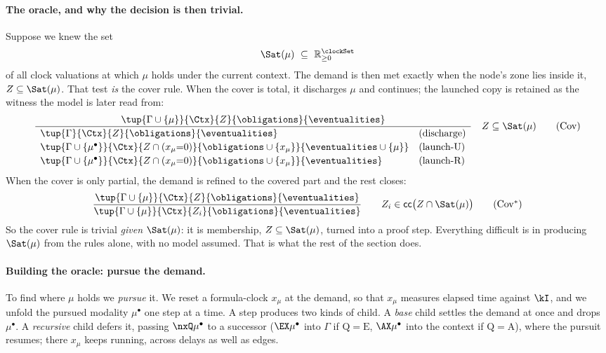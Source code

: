 \paragraph{The oracle, and why the decision is then trivial.}
Suppose we knew the set
\[
\Sat(\mu)\ \subseteq\ \mathbb{R}_{\ge0}^{\clockSet}
\]
of all clock valuations at which $\mu$ holds under the current context. The demand is then met exactly
when the node's zone lies inside it, $Z\subseteq\Sat(\mu)$. That test \emph{is} the cover rule. When the
cover is total, it discharges $\mu$ and continues; the launched copy is retained as the witness the model
is later read from:
\[
\frac{\tup{\Gamma\cup\{\mu\}}{\Ctx}{Z}{\obligations}{\eventualities}}
{\begin{array}{ll}
\tup{\Gamma}{\Ctx}{Z}{\obligations}{\eventualities} & (\text{discharge})\\[2pt]
\tup{\Gamma\cup\{\mu^\bullet\}}{\Ctx}{Z\cap(x_\mu{=}0)}{\obligations\cup\{x_\mu\}}{\eventualities\cup\{\mu\}} & (\text{launch-U})\\[2pt]
\tup{\Gamma\cup\{\mu^\bullet\}}{\Ctx}{Z\cap(x_\mu{=}0)}{\obligations\cup\{x_\mu\}}{\eventualities} & (\text{launch-R})
\end{array}}
\quad Z\subseteq\Sat(\mu)
\tag{\textrm{Cov}}\label{tag:chk}
\]
When the cover is only partial, the demand is refined to the covered part and the rest closes:
\[
\frac{\tup{\Gamma\cup\{\mu\}}{\Ctx}{Z}{\obligations}{\eventualities}}
{\tup{\Gamma\cup\{\mu\}}{\Ctx}{Z_i}{\obligations}{\eventualities}}
\qquad Z_i\in\mathsf{cc}\big(Z\cap\Sat(\mu)\big)
\tag{\textrm{Cov}$^{*}$}\label{tag:chkstar}
\]
So the cover rule is trivial \emph{given} $\Sat(\mu)$: it is membership, $Z\subseteq\Sat(\mu)$, turned
into a proof step. Everything difficult is in producing $\Sat(\mu)$ from the rules alone, with no model
assumed. That is what the rest of the section does.

\paragraph{Building the oracle: pursue the demand.}
To find where $\mu$ holds we \emph{pursue} it. We reset a formula-clock $x_\mu$ at the demand, so that
$x_\mu$ measures elapsed time against $\kI$, and we unfold the pursued modality $\mu^\bullet$ one step at a
time. A step produces two kinds of child. A \emph{base} child settles the demand at once and drops
$\mu^\bullet$. A \emph{recursive} child defers it, passing $\nxQ\mu^\bullet$ to a successor
($\EX\mu^\bullet$ into $\Gamma$ if $\mathrm{Q}=\mathrm{E}$, $\AX\mu^\bullet$ into the context if
$\mathrm{Q}=\mathrm{A}$), where the pursuit resumes; there $x_\mu$ keeps running, across delays as well
as edges.

